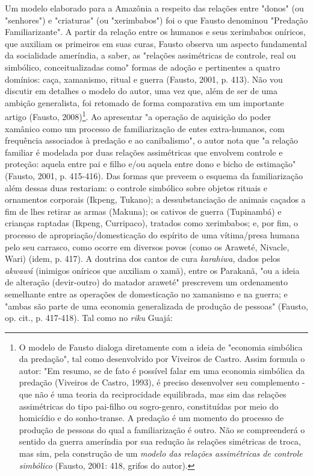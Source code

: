 Um modelo elaborado para a Amazônia a respeito das relações entre
"donos" (ou "senhores") e "criaturas" (ou "xerimbabos") foi o que Fausto
denominou "Predação Familiarizante". A partir da relação entre os
humanos e seus xerimbabos oníricos, que auxiliam os primeiros em suas
curas, Fausto observa um aspecto fundamental da socialidade ameríndia, a
saber, as "relações assimétricas de controle, real ou simbólico,
conceitualizadas como" formas de adoção e pertinentes a quatro domínios:
caça, xamanismo, ritual e guerra (Fausto, 2001, p. 413). Não vou
discutir em detalhes o modelo do autor, uma vez que, além de ser de uma
ambição generalista, foi retomado de forma comparativa em um importante
artigo (Fausto, 2008)\footnote{O modelo de Fausto dialoga diretamente
  com a ideia de "economia simbólica da predação", tal como desenvolvido
  por Viveiros de Castro. Assim formula o autor: "Em resumo, se de fato
  é possível falar em uma economia simbólica da predação (Viveiros de
  Castro, 1993), é preciso desenvolver seu complemento - que não é uma
  teoria da reciprocidade equilibrada, mas sim das relações assimétricas
  do tipo pai-filho ou sogro-genro, constituídas por meio do homicídio e
  do sonho-transe. A predação é um momento do processo de produção de
  pessoas do qual a familiarização é outro. Não se compreenderá o
  sentido da guerra ameríndia por sua redução às relações simétricas de
  troca, mas sim, pela construção de um \emph{modelo das relações
  assimétricas de controle simbólico} (Fausto, 2001: 418, grifos do
  autor).}. Ao apresentar "a operação de aquisição do poder xamânico
como um processo de familiarização de entes extra-humanos, com
frequência associados à predação e ao canibalismo", o autor nota que "a
relação familiar é modelada por duas relações assimétricas que envolvem
controle e proteção: aquela entre pai e filho e/ou aquela entre dono e
bicho de estimação" (Fausto, 2001, p. 415-416). Das formas que preveem o
esquema da familiarização além dessas duas restariam: o controle
simbólico sobre objetos rituais e ornamentos corporais (Ikpeng, Tukano);
a dessubstanciação de animais caçados a fim de lhes retirar as armas
(Makuna); os cativos de guerra (Tupinambá) e crianças raptadas (Ikpeng,
Curripaco), tratados como xerimbabos; e, por fim, o processo de
apropriação/domesticação do espírito de uma vítima/presa humana pelo seu
carrasco, como ocorre em diversos povos (como os Araweté, Nivacle, Wari)
(idem, p. 417). A doutrina dos cantos de cura \emph{karahiwa}, dados
pelos \emph{akwawá} (inimigos oníricos que auxiliam o xamã), entre os
Parakanã, "ou a ideia de alteração (devir-outro) do matador araweté"
prescrevem um ordenamento semelhante entre as operações de domesticação
no xamanismo e na guerra; e "ambas são parte de uma economia
generalizada de produção de pessoas" (Fausto, op. cit., p. 417-418). Tal
como no \emph{riku} Guajá:


